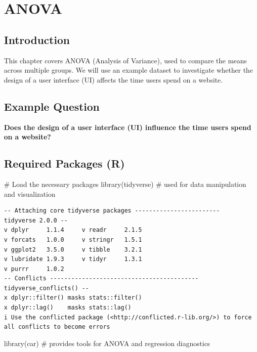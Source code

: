 \documentclass[
  letterpaper,
  DIV=11,
  numbers=noendperiod]{scrreprt}
\newenvironment{Shaded}{\begin{snugshade}}{\end{snugshade}}
\newcommand{\CommentTok}[1]{\textcolor[rgb]{0.37,0.37,0.37}{#1}}
\newcommand{\FunctionTok}[1]{\textcolor[rgb]{0.28,0.35,0.67}{#1}}
\newcommand{\NormalTok}[1]{\textcolor[rgb]{0.00,0.23,0.31}{#1}}
\begin{document}

\chapter{ANOVA}\label{anova}

\section{Introduction}\label{introduction-1}

This chapter covers ANOVA (Analysis of Variance), used to compare the
means across multiple groups. We will use an example dataset to
investigate whether the design of a user interface (UI) affects the time
users spend on a website.

\section{Example Question}\label{example-question}

\textbf{Does the design of a user interface (UI) influence the time
users spend on a website?}

\section{Required Packages (R)}\label{required-packages-r}

\begin{Shaded}
\begin{Highlighting}[]
\CommentTok{\# Load the necessary packages }
\FunctionTok{library}\NormalTok{(tidyverse) }\CommentTok{\# used for data manipulation and visualization}
\end{Highlighting}
\end{Shaded}

\begin{verbatim}
-- Attaching core tidyverse packages ------------------------ tidyverse 2.0.0 --
v dplyr     1.1.4     v readr     2.1.5
v forcats   1.0.0     v stringr   1.5.1
v ggplot2   3.5.0     v tibble    3.2.1
v lubridate 1.9.3     v tidyr     1.3.1
v purrr     1.0.2     
-- Conflicts ------------------------------------------ tidyverse_conflicts() --
x dplyr::filter() masks stats::filter()
x dplyr::lag()    masks stats::lag()
i Use the conflicted package (<http://conflicted.r-lib.org/>) to force all conflicts to become errors
\end{verbatim}

\begin{Shaded}
\begin{Highlighting}[]
\FunctionTok{library}\NormalTok{(car) }\CommentTok{\# provides tools for ANOVA and regression diagnostics}
\end{Highlighting}
\end{Shaded}
\end{document}
